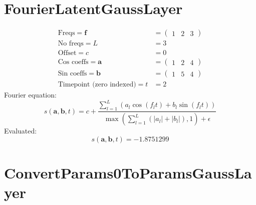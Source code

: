 \documentclass[11pt]{article}
\newcommand{\abf}{\boldsymbol{a}}
\newcommand{\bbf}{\boldsymbol{b}}
\begin{document}
\section{FourierLatentGaussLayer}


\begin{equation}
\begin{split}
\text{Freqs} = \boldsymbol{f}
&=
\begin{pmatrix}
	1 & 2 & 3
\end{pmatrix}
\\
\text{No freqs} = L &= 3 
\\
\text{Offset} = c
&=
0
\\
\text{Cos coeffs} = \boldsymbol{a}
&=
\begin{pmatrix}
	1 & 2 & 4
\end{pmatrix}
\\
\text{Sin coeffs} = \boldsymbol{b}
&=
\begin{pmatrix}
	1 & 5 & 4
\end{pmatrix}
\\
\text{Timepoint (zero indexed)} = t
&=
2
\end{split}
\end{equation}
Fourier equation:
\begin{equation}
s(\abf, \bbf, t) = c + \frac{
\sum_{l=1}^L \left ( a_l \cos(f_l t) + b_l \sin(f_l t) \right )
}{
\max \left ( \sum_{l=1}^L (|a_l| + |b_l|), 1 \right ) + \epsilon
}
\end{equation}
Evaluated:
\begin{equation}
s(\abf, \bbf, t) = -1.8751299
\end{equation}


\section{ConvertParams0ToParamsGaussLayer}

\end{document}
